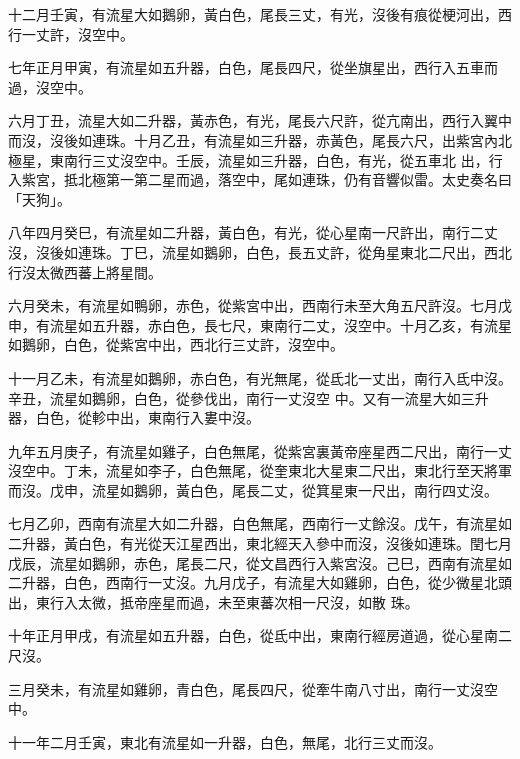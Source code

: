 \begin{pinyinscope}
 十二月壬寅，有流星大如鵝卵，黃白色，尾長三丈，有光，沒後有痕從梗河出，西行一丈許，沒空中。



 七年正月甲寅，有流星如五升器，白色，尾長四尺，從坐旗星出，西行入五車而過，沒空中。



 六月丁丑，流星大如二升器，黃赤色，有光，尾長六尺許，從亢南出，西行入翼中而沒，沒後如連珠。十月乙丑，有流星如三升器，赤黃色，尾長六尺，出紫宮內北極星，東南行三丈沒空中。壬辰，流星如三升器，白色，有光，從五車北
 出，行入紫宮，抵北極第一第二星而過，落空中，尾如連珠，仍有音響似雷。太史奏名曰「天狗」。



 八年四月癸巳，有流星如二升器，黃白色，有光，從心星南一尺許出，南行二丈沒，沒後如連珠。丁巳，流星如鵝卵，白色，長五丈許，從角星東北二尺出，西北行沒太微西蕃上將星間。



 六月癸未，有流星如鴨卵，赤色，從紫宮中出，西南行未至大角五尺許沒。七月戊申，有流星如五升器，赤白色，長七尺，東南行二丈，沒空中。十月乙亥，有流星如鵝卵，白色，從紫宮中出，西北行三丈許，沒空中。



 十一月乙未，有流星如鵝卵，赤白色，有光無尾，從氐北一丈出，南行入氐中沒。辛丑，流星如鵝卵，白色，從參伐出，南行一丈沒空
 中。又有一流星大如三升器，白色，從軫中出，東南行入婁中沒。



 九年五月庚子，有流星如雞子，白色無尾，從紫宮裏黃帝座星西二尺出，南行一丈沒空中。丁未，流星如李子，白色無尾，從奎東北大星東二尺出，東北行至天將軍而沒。戊申，流星如鵝卵，黃白色，尾長二丈，從箕星東一尺出，南行四丈沒。



 七月乙卯，西南有流星大如二升器，白色無尾，西南行一丈餘沒。戊午，有流星如二升器，黃白色，有光從天江星西出，東北經天入參中而沒，沒後如連珠。閏七月戊辰，流星如鵝卵，赤色，尾長二尺，從文昌西行入紫宮沒。己巳，西南有流星如二升器，白色，西南行一丈沒。九月戊子，有流星大如雞卵，白色，從少微星北頭出，東行入太微，抵帝座星而過，未至東蕃次相一尺沒，如散
 珠。



 十年正月甲戌，有流星如五升器，白色，從氐中出，東南行經房道過，從心星南二尺沒。



 三月癸未，有流星如雞卵，青白色，尾長四尺，從牽牛南八寸出，南行一丈沒空中。



 十一年二月壬寅，東北有流星如一升器，白色，無尾，北行三丈而沒。




\end{pinyinscope}
